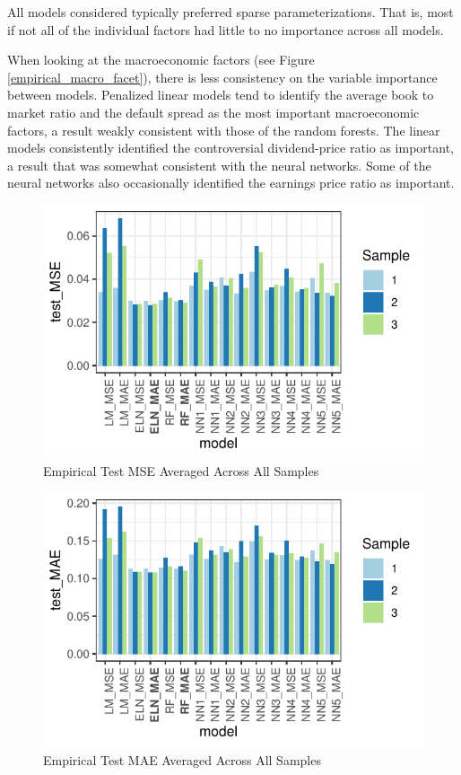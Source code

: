 \documentclass[11pt, a4paper, table]{article}
\begin{document}


All models considered typically preferred sparse parameterizations. That is, most if not all of the individual factors had little to no importance across all models. 

When looking at the macroeconomic factors (see Figure \ref{empirical_macro_facet}), there is less consistency on the variable importance between models. Penalized linear models tend to identify the average book to market ratio and the default spread as the most important macroeconomic factors, a result weakly consistent with those of the random forests. The linear models consistently identified the controversial dividend-price ratio as important, a result that was somewhat consistent with the neural networks. Some of the neural networks also occasionally identified the earnings price ratio as important.

\begin{figure}
	\begin{center}
		\includegraphics{empirical_test_mse}
	\end{center}
	\caption{Empirical Test MSE Averaged Across All Samples}
\end{figure}

\begin{figure}
	\begin{center}
		\includegraphics{empirical_test_mae}
	\end{center}
	\caption{Empirical Test MAE Averaged Across All Samples}
\end{figure}
\end{document}
